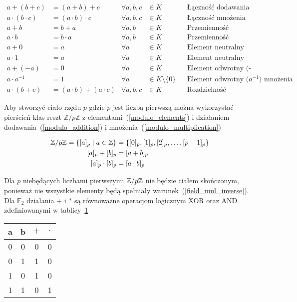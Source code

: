 {\small
    \begin{align}
        a + (b + c) &= (a + b) + c & \forall a,b,c &\in K && \text{Łączność dodawania} \\
        a \cdot (b \cdot c) &= (a \cdot b) \cdot c & \forall a,b,c &\in K && \text{Łączność mnożenia} \\
        a + b &= b + a & \forall a,b &\in K && \text{Przemienność dodawania} \\
        a \cdot b &= b \cdot a & \forall a,b &\in K && \text{Przemienność mnożenia} \\
        a + 0 &= a & \forall a &\in K && \text{Element neutralny (0) dodawania} \\
        a \cdot 1 &= a & \forall a &\in K && \text{Element neutralny (1) mnożenia} \\
        a + (-a) &= 0 & \forall a &\in K && \text{Element odwrotny (-a) dodawania} \\
        a \cdot a^{-1} &= 1 & \forall a &\in K \setminus \{ 0 \} &&
            \text{Element odwrotny (} a^{-1} \text{) mnożenia} \label{field_mul_inverse}\\
        a \cdot (b + c) &= (a \cdot b) + (a \cdot c) & \forall a,b,c &\in K &&
            \text{Rozdzielność mnożenia względem dodawania}
    \end{align}
}%

Aby stworzyć ciało rzędu $p$ gdzie $p$ jest liczbą pierwszą można wykorzystać
pierścień klas reszt $\mathbb{Z} / p \mathbb{Z}$ z elementami~(\ref{modulo_elements})
i działaniem dodawania~(\ref{modulo_addition}) i mnożenia~(\ref{modulo_multiplication})

\begin{align}
    \mathbb{Z} / p \mathbb{Z} = \{ [a]_p \; | \; a \in \mathbb{Z} \} &= \{ [0]_p, [1]_p,
    [2]_p, \ldots, [p-1]_p \} \label{modulo_elements} \\
    [a]_p + [b]_p &= [a + b]_p \label{modulo_addition} \\
    [a]_p \cdot [b]_p &= [a \cdot b]_p \label{modulo_multiplication}
\end{align}

Dla $p$ niebędących liczbami pierwszymi $\mathbb{Z} / p \mathbb{Z}$ nie będzie
ciałem skończonym, ponieważ nie wszystkie elementy będą spełniały
warunek~(\ref{field_mul_inverse}).
Dla $\mathbb{F}_2$ działania $+$ i $*$ są równoważne operacjom logicznym XOR
oraz AND zdefiniowanymi w tablicy~\ref{truth_table:title}
\begin{table}[H]
    \label{truth_table:title}
    \centering
    \begin{tabular}{c c | c c}
        \toprule
        a & b & $+$ & $\cdot$ \\
        \midrule
        0 & 0 & 0 & 0 \\
        \midrule
        0 & 1 & 1 & 0 \\
        \midrule
        1 & 0 & 1 & 0 \\
        \midrule
        1 & 1 & 0 & 1 \\
        \bottomrule
    \end{tabular}
\end{table}

